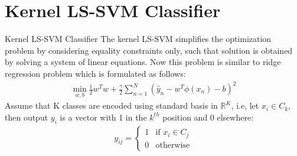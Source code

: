 \documentclass{beamer}
\begin{document}


    \section{Kernel LS-SVM Classifier}
    \begin{frame}{Kernel LS-SVM Classifier}
        The kernel LS-SVM simplifies the optimization problem by
        considering equality constraints only, such that solution is obtained by solving a system of linear equations.
        Now this problem is similar to ridge regression problem which is formulated as follows:
        \begin{align}
            \min_{w,b} \frac{1}{2}w^{T}w + \frac{\gamma}{2}\sum_{n=1}^{N}(\hat{y}_{n} - w^{T}\phi(x_{n}) - b)^{2}
        \end{align}
        Assume that K classes are encoded using standard basis in $\mathbb{R}^{K}$, i.e, let $x_{i} \in C_{k}$, then output
        $ y_{i}$ is a vector with 1 in the $k^{th}$ position and 0 elsewhere:
        \begin{align}
            y_{ij} = \begin{cases}
                         1 & \text{if } x_{i} \in C_{j} \\
                         0 & \text{otherwise}
            \end{cases}
        \end{align}
    \end{frame}
\end{document}

